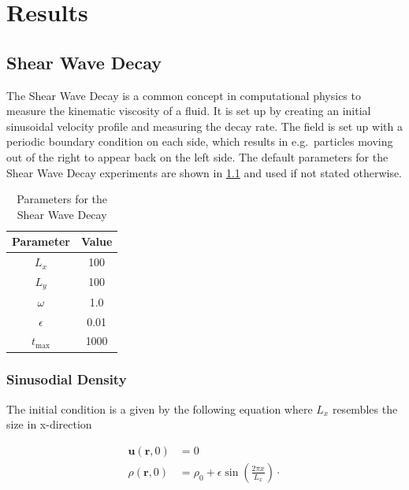 \chapter{Results}\label{ch:results}


\section{Shear Wave Decay}
The Shear Wave Decay is a common concept in computational physics to measure the kinematic viscosity of a fluid.
It is set up by creating an initial sinusoidal velocity profile and measuring the decay rate.
The field is set up with a periodic boundary condition on each side, which results in e.g.\ particles moving out of the right to appear back on the left side.
The default parameters for the Shear Wave Decay experiments are shown in \cref{tab:swd-parameters} and used if not stated otherwise.

\begin{table}[ht]
    \centering %
    \begin{tabular}{c c}
        \hline\hline %
        Parameter  & Value \\ [0.5ex] %
        \hline %
        $L_x$      & 100   \\
        $L_y$      & 100   \\
        $\omega$   & 1.0   \\
        $\epsilon$ & 0.01  \\
        $t_{\max}$ & 1000  \\ [1ex] %
        \hline %
    \end{tabular}
    \caption{Parameters for the Shear Wave Decay} %
    \label{tab:swd-parameters}
\end{table}

\subsection{Sinusodial Density}
The initial condition is a given by the following equation where $L_x$ resembles the size in x-direction

\begin{equation*}
    \begin{aligned}
        \mathbf{u}(\mathbf{r},0) &= 0 \\
        \rho(\mathbf{r},0) &= \rho_0 + \epsilon \sin \left( \frac{2 \pi x}{L_x} \right) \cdot
    \end{aligned}
\end{equation*}

